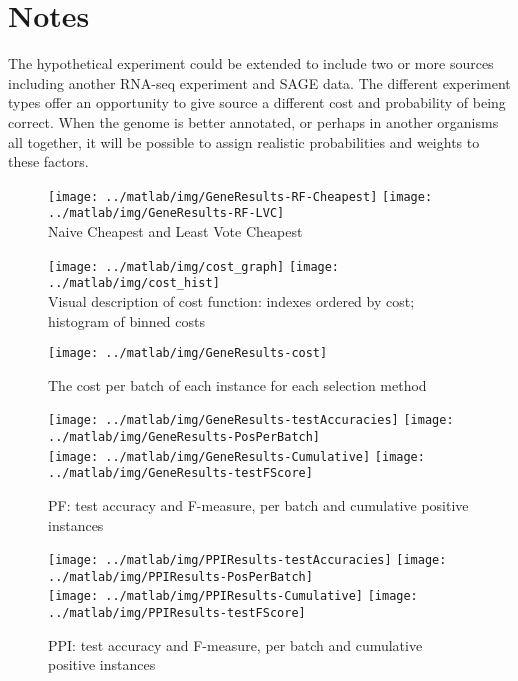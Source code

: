 \documentclass[10pt,a4pape r]{article}
\begin{document}
  \section{Notes}
The hypothetical experiment could be extended to include two or more sources including another RNA-seq experiment and SAGE data. The different experiment types offer an opportunity to give source a different cost and probability of being correct. When the genome is better annotated, or perhaps in another organisms all together, it will be possible to assign realistic probabilities and weights to these factors.

\begin{figure}[p]
\texttt{[image: ../matlab/img/GeneResults-RF-Cheapest]}
\texttt{[image: ../matlab/img/GeneResults-RF-LVC]} \\
\caption{Naive Cheapest and Least Vote Cheapest}
\texttt{[image: ../matlab/img/cost\_graph]} 
\texttt{[image: ../matlab/img/cost\_hist]} \\
\caption{Visual description of cost function: indexes ordered by cost; histogram of binned costs}
\texttt{[image: ../matlab/img/GeneResults-cost]}
\caption{\label{Cost}The cost per batch of each instance for each selection method}
\end{figure}
\begin{figure}[p]
\texttt{[image: ../matlab/img/GeneResults-testAccuracies]}
\texttt{[image: ../matlab/img/GeneResults-PosPerBatch]}\\
\texttt{[image: ../matlab/img/GeneResults-Cumulative]}
\texttt{[image: ../matlab/img/GeneResults-testFScore]}
\caption{\label{PF}PF: test accuracy and F-measure, per batch and cumulative positive instances}
\end{figure}
\begin{figure}[p]
\texttt{[image: ../matlab/img/PPIResults-testAccuracies]}
\texttt{[image: ../matlab/img/PPIResults-PosPerBatch]} \\
\texttt{[image: ../matlab/img/PPIResults-Cumulative]}
\texttt{[image: ../matlab/img/PPIResults-testFScore]}
\caption{\label{PPI}PPI: test accuracy and F-measure, per batch and cumulative positive instances}
\end{figure}


{}

\end{document}
